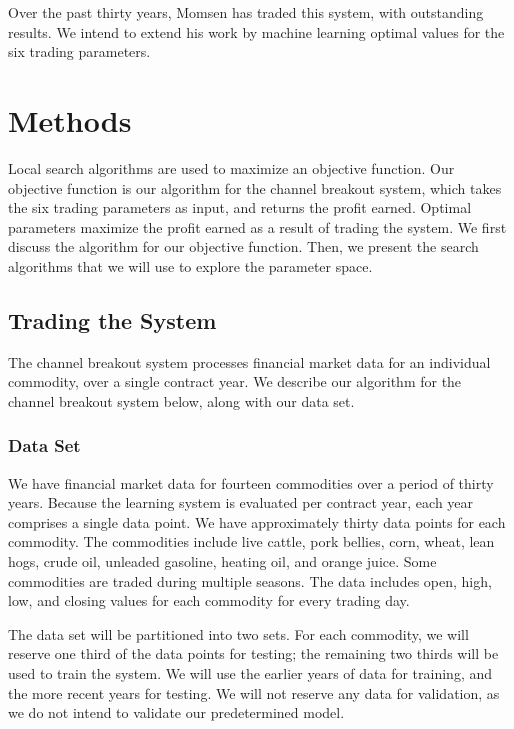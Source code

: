 \documentclass[12pt]{article}
\begin{document}
Over the past thirty years, Momsen has traded this system, with outstanding
results.  We intend to extend his work by machine learning optimal values for
the six trading parameters.

\section{Methods}

Local search algorithms are used to maximize an objective function. Our
objective function is our algorithm for the channel breakout system, which
takes the six trading parameters as input, and returns the profit
earned. Optimal parameters maximize the profit earned as a result of trading the
system. We first discuss the algorithm for our objective function. Then, we
present the search algorithms that we will use to explore the parameter space.

\subsection{Trading the System}

The channel breakout system processes financial market data for an individual
commodity, over a single contract year.  We describe our algorithm for the
channel breakout system below, along with our data set.

\vspace{25pt}
\subsubsection{Data Set}

We have financial market data for fourteen commodities over a period of thirty
years.  Because the learning system is evaluated per contract year, each year
comprises a single data point.  We have approximately thirty data points for
each commodity.  The commodities include live cattle, pork bellies, corn,
wheat, lean hogs, crude oil, unleaded gasoline, heating oil, and orange juice.
Some commodities are traded during multiple seasons.  The data includes open,
high, low, and closing values for each commodity for every trading day.

The data set will be partitioned into two sets. For each commodity, we will
reserve one third of the data points for testing; the remaining two thirds will
be used to train the system. We will use the earlier years of data for
training, and the more recent years for testing. We will not reserve any data
for validation, as we do not intend to validate our predetermined model.
\end{document}
